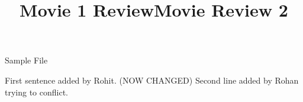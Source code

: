 \documentclass{article}
\begin{document}
\title{Movie 1 Review}


\centerline{\sc \large Sample File}
\vspace{.5pc}
\centerline{\sc }
\vspace{2pc}
\title{Movie Review 2}

First sentence added by Rohit. (NOW CHANGED)
Second line added by Rohan trying to conflict.
\end{document}
